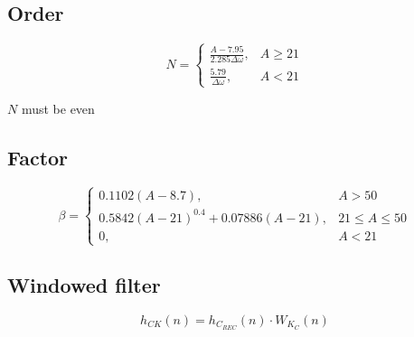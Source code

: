 \documentclass{article}
\begin{document}
\subsection{Order}
\begin{equation}
    N =
    \begin{cases}
        \frac{A-7.95}{2.285\Delta\omega}, & A \geq 21 \\
        \frac{5.79}{\Delta\omega}, & A < 21
    \end{cases}
\end{equation}

$N$ must be even

\subsection{Factor}
\begin{equation}
    \beta =
    \begin{cases}
        0.1102\left(A-8.7\right), & A > 50 \\
        0.5842\left(A-21\right)^{0.4}+0.07886\left(A-21\right), & 21 \leq A \leq 50 \\
        0, & A < 21
    \end{cases}
\end{equation}

\subsection{Windowed filter}
\begin{equation}
    h_{CK}\left(n\right) = h_{C_{REC}}\left(n\right) \cdot W_{K_C}\left(n\right)
\end{equation}
\end{document}
